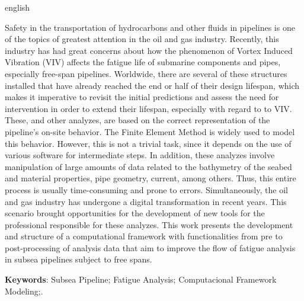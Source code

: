 \begin{resumo}[Abstract]
    \begin{otherlanguage*}{english}

    Safety in the transportation of hydrocarbons and other fluids in pipelines is one of the topics of greatest attention in the oil and gas industry.
    Recently, this industry has had great concerns about how the phenomenon of Vortex Induced Vibration (VIV) affects the fatigue life of submarine components and pipes, especially free-span pipelines.
    Worldwide, there are several of these structures installed that have already reached the end or half of their design lifespan, which makes it imperative to revisit the initial predictions and assess the need for intervention in order to extend their lifespan, especially with regard to to VIV.
    These, and other analyzes, are based on the correct representation of the pipeline's on-site behavior.
    The Finite Element Method is widely used to model this behavior.
    However, this is not a trivial task, since it depends on the use of various software for intermediate steps.
    In addition, these analyzes involve manipulation of large amounts of data related to the bathymetry of the seabed and material properties, pipe geometry, current, among others.
    Thus, this entire process is usually time-consuming and prone to errors.
    Simultaneously, the oil and gas industry has undergone a digital transformation in recent years.
    This scenario brought opportunities for the development of new tools for the professional responsible for these analyzes.
    This work presents the development and structure of a computational framework with functionalities from pre to post-processing of analysis data that aim to improve the flow of fatigue analysis in subsea pipelines subject to free spans.

    \vspace{\onelineskip}

    \noindent
    \textbf{Keywords}: Subsea Pipeline; Fatigue Analysis; Computacional Framework Modeling;.
    \end{otherlanguage*}
\end{resumo}